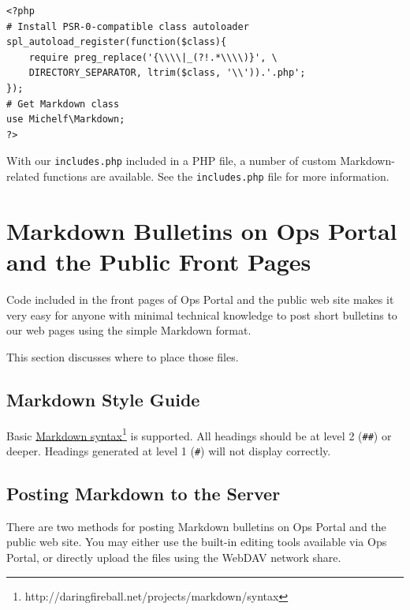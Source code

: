 \documentclass[pdflatex,letterpaper,twoside,12pt]{book}
\begin{document}
\begin{verbatim}
<?php
# Install PSR-0-compatible class autoloader
spl_autoload_register(function($class){
	require preg_replace('{\\\\|_(?!.*\\\\)}', \
	DIRECTORY_SEPARATOR, ltrim($class, '\\')).'.php';
});
# Get Markdown class
use Michelf\Markdown;
?>
\end{verbatim}

With our \texttt{includes.php} included in a PHP file, a number of custom Markdown-related functions are available.  See the \texttt{includes.php} file for more information.


\section{Markdown Bulletins on Ops Portal and the Public Front Pages}\label{markdown-bulletins}

Code included in the front pages of Ops Portal and the public web site makes it very easy for anyone with minimal technical knowledge to post short bulletins to our web pages using the simple Markdown format.

This section discusses where to place those files.

\subsection{Markdown Style Guide}

Basic \href{http://daringfireball.net/projects/markdown/syntax}{Markdown syntax}\footnote{http://daringfireball.net/projects/markdown/syntax} is supported.  All headings should be at level 2 (\texttt{\#\#}) or deeper.  Headings generated at level 1 (\texttt{\#}) will not display correctly.

\subsection{Posting Markdown to the Server}

There are two methods for posting Markdown bulletins on Ops Portal and the public web site.  You may either use the built-in editing tools available via Ops Portal, or directly upload the files using the WebDAV network share.
\end{document}

